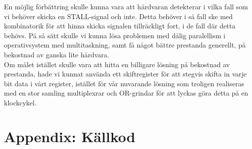 \documentclass[a4paper]{article}
\begin{document}
En möjlig förbättring skulle kunna vara att hårdvaran detekterar i vilka fall som vi behöver skicka
en STALL-signal och inte. Detta behöver i så fall ske med kombinatorik för att hinna skicka signalen
tillräckligt fort, i de fall där detta behövs. På så sätt skulle vi kunna lösa problemen med
dålig paralellism i operativsystem med multitaskning, samt få något bättre prestanda generellt,
på bekostnad av ganska lite hårdvara.\\

Om målet istället skulle vara att hitta en billigare lösning på bekostnad av prestanda, hade vi kunnat använda
ett skiftregister för att stegvis skifta in varje bit data i vårt register, istället för vår nuvarande
lösning som troligen realiseras med en stor samling multiplexrar och OR-grindar för att lyckas göra
detta på en klockcykel.\\

\section{Appendix: Källkod}
\end{document}

